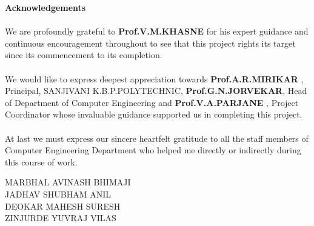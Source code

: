 \begin{center}
\thispagestyle{empty}
\LARGE{\textbf{Acknowledgements}}\\[1cm]
\end{center}
\linespread{1.13}
\large{\paragraph{}We are profoundly grateful to \textbf{Prof.V.M.KHASNE} for his expert guidance
and continuous encouragement throughout to see that this project rights its
target since its commencement to its completion.}
\large{\paragraph{}We would like to express deepest appreciation towards \textbf{Prof.A.R.MIRIKAR },
Principal, SANJIVANI K.B.P.POLYTECHNIC, \textbf{Prof.G.N.JORVEKAR}, 
Head of Department of Computer Engineering and \textbf{Prof.V.A.PARJANE }, Project Coordinator whose
invaluable guidance supported us in completing this project.}
\large{\paragraph{}At last we must express our sincere heartfelt gratitude to all the staff members
of Computer Engineering Department who helped me directly or indirectly during this course of work.}
\begin{flushright}
{
MARBHAL AVINASH BHIMAJI\\
JADHAV SHUBHAM ANIL\\
DEOKAR MAHESH SURESH\\
ZINJURDE YUVRAJ VILAS
}
\end{flushright}
\newpage
